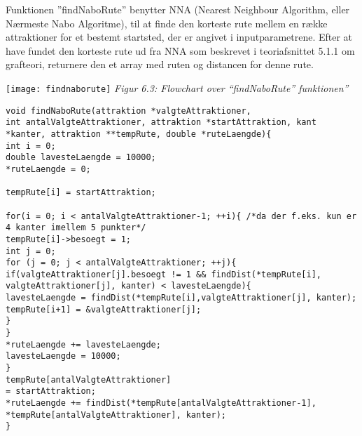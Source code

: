 Funktionen ”findNaboRute” benytter NNA (Nearest Neighbour Algorithm, eller Nærmeste Nabo Algoritme), til at finde den korteste rute mellem en række attraktioner for et bestemt startsted, der er angivet i inputparametrene. Efter at have fundet den korteste rute ud fra NNA som beskrevet i teoriafsnittet 5.1.1 om grafteori, returnere den et array med ruten og distancen for denne rute. \newline
\begin{flushleft}
	\texttt{[image: findnaborute]}\newline
	\textit{Figur 6.3: Flowchart over “findNaboRute” funktionen”}
\end{flushleft}
\begin{lstlisting}
void findNaboRute(attraktion *valgteAttraktioner, 
int antalValgteAttraktioner, attraktion *startAttraktion, kant *kanter, attraktion **tempRute, double *ruteLaengde){
int i = 0;
double lavesteLaengde = 10000;
*ruteLaengde = 0;

tempRute[i] = startAttraktion;

for(i = 0; i < antalValgteAttraktioner-1; ++i){ /*da der f.eks. kun er 4 kanter imellem 5 punkter*/
tempRute[i]->besoegt = 1;
int j = 0;
for (j = 0; j < antalValgteAttraktioner; ++j){
if(valgteAttraktioner[j].besoegt != 1 && findDist(*tempRute[i], valgteAttraktioner[j], kanter) < lavesteLaengde){
lavesteLaengde = findDist(*tempRute[i],valgteAttraktioner[j], kanter);
tempRute[i+1] = &valgteAttraktioner[j];
}
}
*ruteLaengde += lavesteLaengde;
lavesteLaengde = 10000;
}
tempRute[antalValgteAttraktioner] 
= startAttraktion;
*ruteLaengde += findDist(*tempRute[antalValgteAttraktioner-1], *tempRute[antalValgteAttraktioner], kanter);
}
\end{lstlisting}


